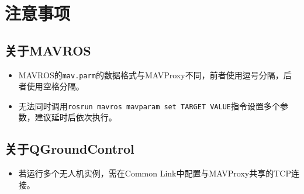\documentclass{tufte-handout}
\begin{document}
\section{注意事项}
\subsection{关于MAVROS}
\begin{itemize}
    \item MAVROS的\;\lstinline{mav.parm}\;的数据格式与MAVProxy不同，前者使用逗号分隔，后者使用空格分隔。
    \item 无法同时调用\;\lstinline{rosrun mavros mavparam set TARGET VALUE}\;指令设置多个参数，建议延时后依次执行。
\end{itemize}
\subsection{关于QGroundControl}
\begin{itemize}
    \item 若运行多个无人机实例，需在Common Link中配置与MAVProxy共享的TCP连接。
\end{itemize}
\end{document}
